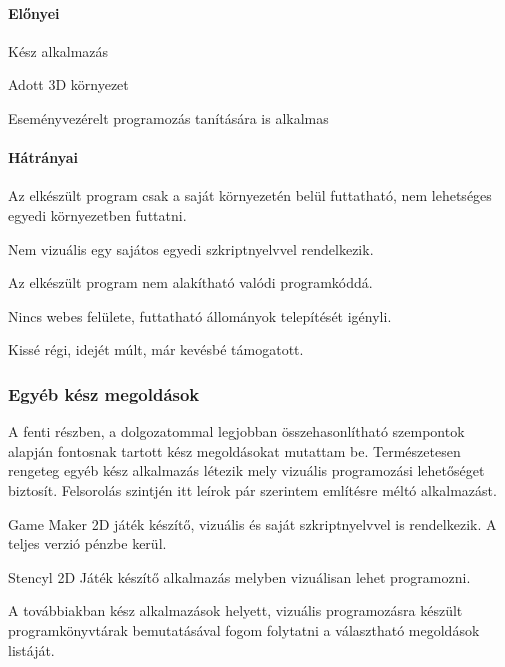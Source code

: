 \documentclass[12pt,a4paper,oneside]{report} %
\begin{document}
\paragraph{Előnyei} 
\begin{compactitem}
	\item Kész alkalmazás
	\item Adott 3D környezet
	\item Eseményvezérelt programozás tanítására is alkalmas
\end{compactitem}
\paragraph{Hátrányai} 
\begin{compactitem}
	\item Az elkészült program csak a saját környezetén belül futtatható, nem lehetséges egyedi környezetben futtatni.
	\item Nem vizuális egy sajátos egyedi szkriptnyelvvel rendelkezik.
	\item Az elkészült program nem alakítható valódi programkóddá.
	\item Nincs webes felülete, futtatható állományok telepítését igényli.
	\item Kissé régi, idejét múlt, már kevésbé támogatott.
\end{compactitem}
\subsubsection{Egyéb kész megoldások}
A fenti részben, a dolgozatommal legjobban összehasonlítható szempontok alapján fontosnak tartott kész megoldásokat mutattam be. Természetesen rengeteg egyéb kész alkalmazás létezik mely vizuális programozási lehetőséget biztosít. Felsorolás szintjén itt leírok pár szerintem említésre méltó alkalmazást. 
\begin{compactitem}
	\item Game Maker \cite{jenson2016exploring} 2D játék készítő, vizuális és saját szkriptnyelvvel is rendelkezik. A teljes verzió pénzbe kerül.
	\item Stencyl \cite{liu2014making} 2D Játék készítő alkalmazás melyben vizuálisan lehet programozni.
\end{compactitem}
A továbbiakban kész alkalmazások helyett, vizuális programozásra készült programkönyvtárak bemutatásával fogom folytatni a választható megoldások listáját.  
\end{document}
